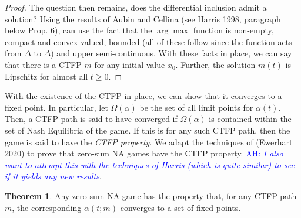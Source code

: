 \documentclass{article}
\theoremstyle{definition}
\newtheorem{theorem}{Theorem}
\newcommand{\ah}[1]{\textcolor{blue}{AH: \textit{#1}}}
\begin{document}
\begin{proof}
		The question then remains, does the differential inclusion admit a solution? Using the
		results of Aubin and Cellina (see Harris 1998, paragraph below Prop. 6), can use the fact
		that the $\arg \max$ function is non-empty, compact and convex valued, bounded (all of
		these follow since the function acts from $\Delta$ to $\Delta$) and upper semi-continuous. 
		With these facts in place, we can say that there is a CTFP $m$ for any initial value $x_0$. Further, the solution $m(t)$ is Lipschitz for almost all $t \geq 0$.

	\end{proof}

	With the existence of the CTFP in place, we can show that it converges to a fixed point. In particular, let $\Omega(\alpha)$ be the set of all limit points for $\alpha(t)$. Then, a CTFP path is said to have converged if $\Omega(\alpha)$ is contained within the set of Nash Equilibria of the game. If this is for any such CTFP path, then the game is said to have the \emph{CTFP property}. We adapt the techniques of (Ewerhart 2020) to prove that zero-sum NA games have the CTFP property. \ah{I also want to attempt this with the techniques of Harris (which is quite similar) to see if it yields any new results}.

	\begin{theorem}
		Any zero-sum NA game has the property that, for any CTFP path $m$, the corresponding $\alpha(t; m)$ converges to a set of fixed points.
	\end{theorem}
\end{document}
